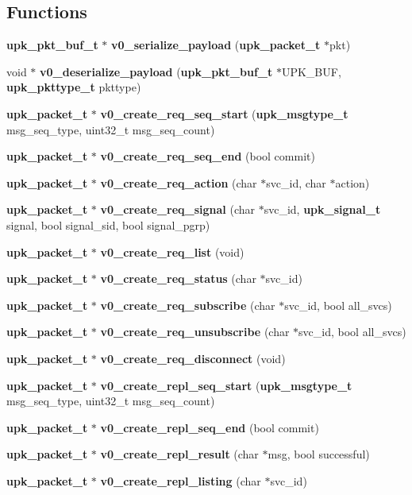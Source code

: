 \subsection*{Functions}
\begin{DoxyCompactItemize}
\item 
{\bf upk\_\-pkt\_\-buf\_\-t} $\ast$ {\bf v0\_\-serialize\_\-payload} ({\bf upk\_\-packet\_\-t} $\ast$pkt)
\item 
void $\ast$ {\bf v0\_\-deserialize\_\-payload} ({\bf upk\_\-pkt\_\-buf\_\-t} $\ast$UPK\_\-BUF, {\bf upk\_\-pkttype\_\-t} pkttype)
\item 
{\bf upk\_\-packet\_\-t} $\ast$ {\bf v0\_\-create\_\-req\_\-seq\_\-start} ({\bf upk\_\-msgtype\_\-t} msg\_\-seq\_\-type, uint32\_\-t msg\_\-seq\_\-count)
\item 
{\bf upk\_\-packet\_\-t} $\ast$ {\bf v0\_\-create\_\-req\_\-seq\_\-end} (bool commit)
\item 
{\bf upk\_\-packet\_\-t} $\ast$ {\bf v0\_\-create\_\-req\_\-action} (char $\ast$svc\_\-id, char $\ast$action)
\item 
{\bf upk\_\-packet\_\-t} $\ast$ {\bf v0\_\-create\_\-req\_\-signal} (char $\ast$svc\_\-id, {\bf upk\_\-signal\_\-t} signal, bool signal\_\-sid, bool signal\_\-pgrp)
\item 
{\bf upk\_\-packet\_\-t} $\ast$ {\bf v0\_\-create\_\-req\_\-list} (void)
\item 
{\bf upk\_\-packet\_\-t} $\ast$ {\bf v0\_\-create\_\-req\_\-status} (char $\ast$svc\_\-id)
\item 
{\bf upk\_\-packet\_\-t} $\ast$ {\bf v0\_\-create\_\-req\_\-subscribe} (char $\ast$svc\_\-id, bool all\_\-svcs)
\item 
{\bf upk\_\-packet\_\-t} $\ast$ {\bf v0\_\-create\_\-req\_\-unsubscribe} (char $\ast$svc\_\-id, bool all\_\-svcs)
\item 
{\bf upk\_\-packet\_\-t} $\ast$ {\bf v0\_\-create\_\-req\_\-disconnect} (void)
\item 
{\bf upk\_\-packet\_\-t} $\ast$ {\bf v0\_\-create\_\-repl\_\-seq\_\-start} ({\bf upk\_\-msgtype\_\-t} msg\_\-seq\_\-type, uint32\_\-t msg\_\-seq\_\-count)
\item 
{\bf upk\_\-packet\_\-t} $\ast$ {\bf v0\_\-create\_\-repl\_\-seq\_\-end} (bool commit)
\item 
{\bf upk\_\-packet\_\-t} $\ast$ {\bf v0\_\-create\_\-repl\_\-result} (char $\ast$msg, bool successful)
\item 
{\bf upk\_\-packet\_\-t} $\ast$ {\bf v0\_\-create\_\-repl\_\-listing} (char $\ast$svc\_\-id)

\end{DoxyCompactItemize}

